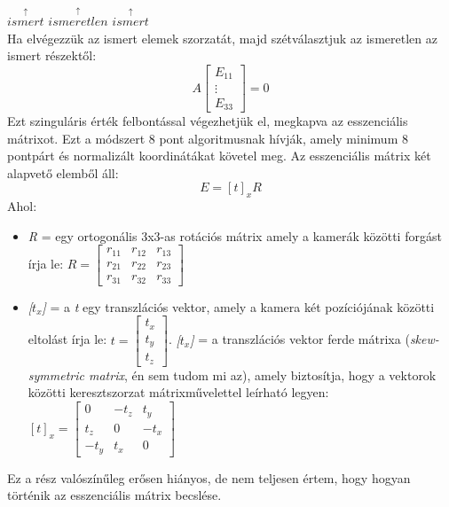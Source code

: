 \documentclass[12pt]{report}
\begin{document}
\begin{enumerate}
                        \hspace{3cm} $\overset{\uparrow}{ismert}$ \hspace{1cm} $\overset{\uparrow}{ismeretlen}$ \hspace{0.1cm} $\overset{\uparrow}{ismert}$\\
                    Ha elvégezzük az ismert elemek szorzatát, majd szétválasztjuk az ismeretlen az ismert részektől:
                    \[A\begin{bmatrix}E_{11}\\\vdots\\E_{33}\end{bmatrix} = 0\]
                    Ezt szinguláris érték felbontással végezhetjük el, megkapva az esszenciális mátrixot. Ezt a módszert 8 pont algoritmusnak hívják, amely minimum 8 pontpárt és normalizált koordinátákat követel meg.
                    Az esszenciális mátrix két alapvető elemből áll:
                    \[E = [t]_xR\]
                    Ahol:
                    \begin{itemize}
                        \item \textit{R} = egy ortogonális 3x3-as rotációs mátrix amely a kamerák közötti forgást írja le: $R = \begin{bmatrix}r_{11}&r_{12}&r_{13}\\r_{21}&r_{22}&r_{23}\\r_{31}&r_{32}&r_{33}\end{bmatrix}$
                        \item \textit{[$t_x$]} = a \textit{t} egy transzlációs vektor, amely a kamera két pozíciójának közötti eltolást írja le: $t = \begin{bmatrix}t_x\\t_y\\t_z\end{bmatrix}$. \textit{[$t_x$]} = a transzlációs vektor ferde mátrixa (\textit{skew-symmetric matrix}, én sem tudom mi az), amely biztosítja, hogy a vektorok közötti keresztszorzat mátrixművelettel leírható legyen: $[t]_x = \begin{bmatrix}0&-t_z&t_y\\t_z&0&-t_x\\-t_y&t_x&0\end{bmatrix}$\\
                    \end{itemize}
                    Ez a rész valószínűleg erősen hiányos, de nem teljesen értem, hogy hogyan történik az esszenciális mátrix becslése.\\

\end{enumerate}
\end{document}
